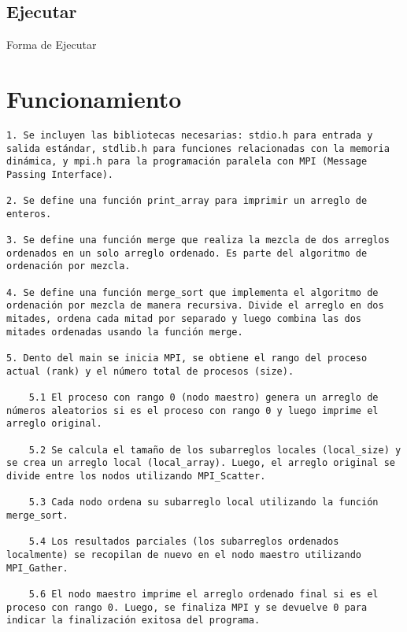 \documentclass[a4paper,12pt]{article}
\begin{document}
\subsection*{Ejecutar}
\begin{center}
    Forma de Ejecutar
\end{center}

\section*{Funcionamiento}
\begin{verbatim}
1. Se incluyen las bibliotecas necesarias: stdio.h para entrada y salida estándar, stdlib.h para funciones relacionadas con la memoria dinámica, y mpi.h para la programación paralela con MPI (Message Passing Interface).

2. Se define una función print_array para imprimir un arreglo de enteros.

3. Se define una función merge que realiza la mezcla de dos arreglos ordenados en un solo arreglo ordenado. Es parte del algoritmo de ordenación por mezcla.

4. Se define una función merge_sort que implementa el algoritmo de ordenación por mezcla de manera recursiva. Divide el arreglo en dos mitades, ordena cada mitad por separado y luego combina las dos mitades ordenadas usando la función merge.

5. Dento del main se inicia MPI, se obtiene el rango del proceso actual (rank) y el número total de procesos (size).
    
    5.1 El proceso con rango 0 (nodo maestro) genera un arreglo de números aleatorios si es el proceso con rango 0 y luego imprime el arreglo original.
    
    5.2 Se calcula el tamaño de los subarreglos locales (local_size) y se crea un arreglo local (local_array). Luego, el arreglo original se divide entre los nodos utilizando MPI_Scatter.
    
    5.3 Cada nodo ordena su subarreglo local utilizando la función merge_sort.

    5.4 Los resultados parciales (los subarreglos ordenados localmente) se recopilan de nuevo en el nodo maestro utilizando MPI_Gather.

    5.6 El nodo maestro imprime el arreglo ordenado final si es el proceso con rango 0. Luego, se finaliza MPI y se devuelve 0 para indicar la finalización exitosa del programa. 

\end{verbatim}
\end{document}
